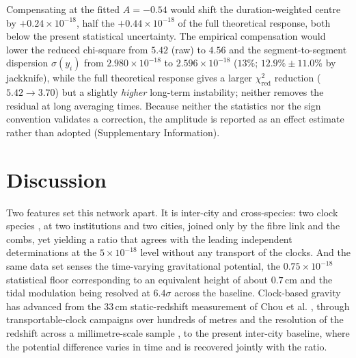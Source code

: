 \documentclass[11pt,a4paper]{article}
\newcommand{\e}[1]{\times 10^{#1}}
\begin{document}
Compensating at the fitted $A=-0.54$ would shift the duration-weighted
centre by $+0.24\e{-18}$, half the $+0.44\e{-18}$ of the full theoretical
response, both below the present statistical uncertainty. The empirical
compensation would lower the reduced chi-square from $5.42$ (raw) to
$4.56$ and the segment-to-segment dispersion $\sigma(y_i)$ from
$2.980\e{-18}$ to $2.596\e{-18}$ ($13\%$; $12.9\%\pm11.0\%$ by jackknife),
while the full theoretical response gives a larger
$\chi^{2}_{\mathrm{red}}$ reduction ($5.42\to3.70$) but a slightly
\emph{higher} long-term instability; neither removes the residual at long
averaging times. Because neither the statistics nor the sign convention
validates a correction, the amplitude is reported as an effect estimate
rather than adopted (Supplementary Information).



\section{Discussion}
\label{sec:caveats}

Two features set this network apart. It is inter-city and cross-species:
two clock species \citep{zhu2026yb, jia2026sr}, at two institutions and
two cities, joined only by the fibre link and the combs, yet yielding a
ratio that agrees with the leading independent determinations at the
$5\e{-18}$ level without any transport of the clocks. And the same data
set senses the time-varying gravitational potential, the $0.75\e{-18}$
statistical floor corresponding to an equivalent height of about
$0.7$\,cm and the tidal modulation being resolved at $6.4\sigma$ across
the baseline. Clock-based gravity has advanced from the $33$\,cm
static-redshift measurement of Chou et al. \citep{chou2010redshift},
through transportable-clock campaigns over hundreds of metres
\citep{takamoto2020redshift, grotti2018geodesy} and the resolution of the
redshift across a millimetre-scale sample \citep{bothwell2022redshift}, to
the present inter-city baseline, where the potential difference varies in
time and is recovered jointly with the ratio.
\end{document}
